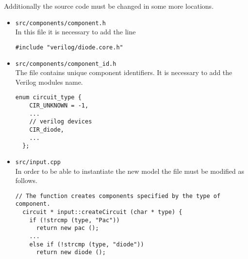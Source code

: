Additionally the source code must be changed in some more locations.
\begin{itemize}
\item \Verb+src/components/component.h+\\
In this file it is necessary to add the line
\begin{Verbatim}[fontsize=\small]
  #include "verilog/diode.core.h"
\end{Verbatim}
\item \Verb+src/components/component_id.h+\\
The file contains unique component identifiers.  It is necessary to
add the Verilog modules name.
\begin{Verbatim}[fontsize=\small]
  enum circuit_type {
    CIR_UNKNOWN = -1,
    ...
    // verilog devices
    CIR_diode,
    ...
  };
\end{Verbatim}
\item \Verb+src/input.cpp+\\
In order to be able to instantiate the new model the file must be
modified as follows.
\begin{Verbatim}[fontsize=\small]
  // The function creates components specified by the type of component. 
  circuit * input::createCircuit (char * type) {
    if (!strcmp (type, "Pac"))
      return new pac ();
    ...
    else if (!strcmp (type, "diode"))
      return new diode ();


\end{Verbatim}
\end{itemize}
